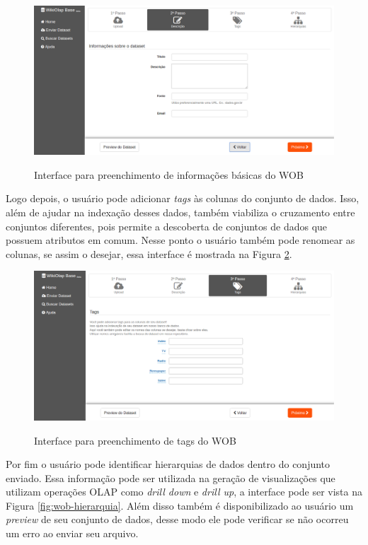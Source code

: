\begin{figure}[!htb]
    \centering
    \caption{Interface para preenchimento de informações básicas do WOB}
    \includegraphics[width=1\textwidth]{./04-figuras/wob-info}
    \label{fig:wob-info}
\end{figure} \newpage


Logo depois, o usuário pode adicionar \textit{tags} às colunas do conjunto de dados. Isso, 
além de ajudar na indexação desses dados, também viabiliza o cruzamento entre conjuntos 
diferentes, pois permite a descoberta de conjuntos de dados que possuem atributos em comum. 
Nesse ponto o usuário também pode renomear as colunas, se assim o desejar, essa interface é 
mostrada na Figura \ref{fig:wob-tags}. 

\begin{figure}[!htb]
    \centering
    \caption{Interface para preenchimento de tags do WOB}
    \includegraphics[width=1\textwidth]{./04-figuras/wob-tags}
    \label{fig:wob-tags}
\end{figure}

Por fim o usuário pode identificar hierarquias de dados dentro do conjunto enviado. Essa 
informação pode ser utilizada na geração de visualizações que utilizam operações OLAP como 
\textit{drill down} e \textit{drill up}, a interface pode ser vista na Figura \ref{fig:wob-hierarquia}. 
Além disso também é disponibilizado ao usuário um \textit{preview} de seu conjunto de dados, 
desse modo ele pode verificar se não ocorreu um erro ao enviar seu arquivo.

